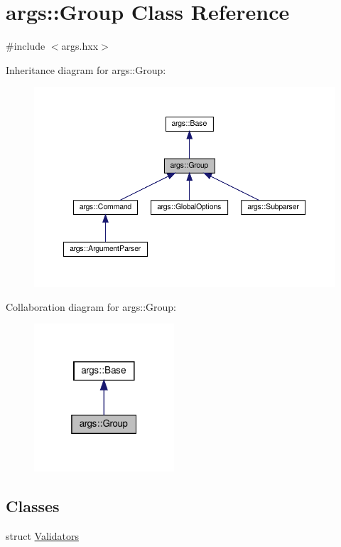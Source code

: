 \hypertarget{classargs_1_1_group}{}\section{args\+:\+:Group Class Reference}
\label{classargs_1_1_group}


{\ttfamily \#include $<$args.\+hxx$>$}



Inheritance diagram for args\+:\+:Group\+:\nopagebreak
\begin{figure}[H]
\begin{center}
\leavevmode
\includegraphics[width=350pt]{classargs_1_1_group__inherit__graph}
\end{center}
\end{figure}


Collaboration diagram for args\+:\+:Group\+:\nopagebreak
\begin{figure}[H]
\begin{center}
\leavevmode
\includegraphics[width=148pt]{classargs_1_1_group__coll__graph}
\end{center}
\end{figure}
\subsection*{Classes}
\begin{DoxyCompactItemize}
\item 
struct \hyperlink{structargs_1_1_group_1_1_validators}{Validators}
\end{DoxyCompactItemize}

